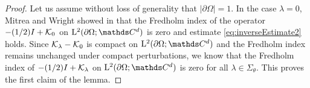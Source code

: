 \begin{proof}
  Let us assume without loss of generality that $|\partial\Omega| = 1$.
  In the case $\lambda = 0$, Mitrea and Wright showed in \cite[Eq.\@~(5.166)]{mitreaWright} that the Fredholm index of the operator $-(1/2)I + \mathcal{K}_0$ on $\Ell^2(\partial\Omega; \C^d)$ is zero and estimate \eqref{eq:inverseEstimate2} holds.
  Since $\mathcal{K}_\lambda - \mathcal{K}_0$ is compact on $\Ell^2(\partial\Omega; \C^d)$ and the Fredholm index remains unchanged under compact perturbations, we know that the Fredholm index of $-(1/2)I + \mathcal{K}_\lambda$ on $\Ell^2(\partial\Omega; \C^d)$ is zero for all $\lambda \in \Sigma_\theta$.
  This proves the first claim of the lemma.


\end{proof}
